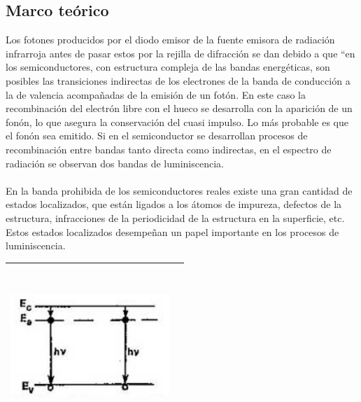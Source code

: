 \documentclass[12]{article}
\newenvironment{Figure}
{\par\medskip\noindent\minipage{\linewidth}}
{\endminipage\par\medskip}
\begin{document}
\begin{multicols}{2}
\section{Marco teórico}
Los fotones producidos por el diodo emisor de la fuente emisora de radiación infrarroja antes de pasar estos por la rejilla de difracción se dan debido a que “en los semiconductores, con estructura compleja de las bandas energéticas, son posibles las transiciones indirectas de los electrones de la banda de conducción  a la de valencia acompañadas de la emisión de un fotón. En este caso la recombinación del electrón libre con el hueco se desarrolla con la aparición de un fonón, lo que asegura la conservación del cuasi impulso. Lo más probable es que el fonón sea emitido. Si en el semiconductor se desarrollan procesos de recombinación entre bandas  tanto directa como indirectas, en el espectro de radiación se observan dos bandas de luminiscencia. \\ \\
En la banda prohibida de los semiconductores reales existe una gran cantidad de estados localizados, que están ligados a los átomos de impureza, defectos de la estructura, infracciones de la periodicidad de la estructura en la superficie, etc. Estos estados localizados desempeñan un papel importante  en los procesos de luminiscencia. 
\begin{Figure}	
\center
\begin{tabular}{|l|r|}
\hline
\includegraphics[width=6cm, height=6cm]{img/transiciones.png} \\ \hline
\end{tabular}
\label{fig:g1}
\end{Figure}

\end{multicols}
\end{document}

